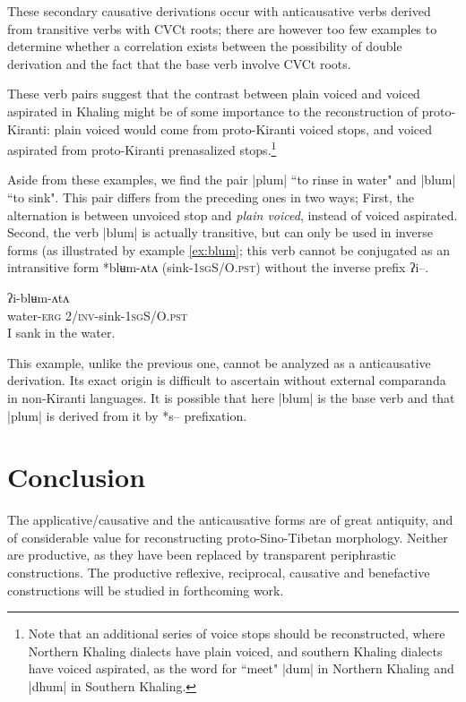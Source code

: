 \documentclass[oldfontcommands,oneside,a4paper,11pt]{article}
\newcommand{\ipa}[1]{{\phon #1}} %
\newcommand{\dhatu}[1]{|\ipa{#1}|}
\begin{document}
These secondary causative derivations occur with anticausative verbs derived from transitive verbs with CVCt roots; there are however too few examples to determine whether a correlation exists between the possibility of double derivation and the fact that the base verb involve CVCt roots.

These verb pairs suggest that the contrast between plain voiced and voiced aspirated in Khaling might be of some importance to the reconstruction of proto-Kiranti: plain voiced would come from proto-Kiranti voiced stops, and voiced aspirated from proto-Kiranti prenasalized stops.\footnote{Note that an additional series of voice stops should be reconstructed, where Northern Khaling dialects have plain voiced, and southern Khaling dialects have voiced aspirated, as the word for ``meet" \dhatu{dum} in Northern Khaling and \dhatu{dhum} in Southern Khaling.}


Aside from these examples, we find the pair \dhatu{plum} ``to rinse in water" and \dhatu{blum} ``to sink". This pair differs from the preceding ones in two ways; First, the alternation is between unvoiced stop and\textit{ plain voiced}, instead of voiced aspirated. Second, the verb \dhatu{blum} is actually transitive, but can only be used in inverse forms (as illustrated by example \ref{ex:blum}; this verb cannot be conjugated as an intransitive form *\ipa{blʉm-ʌtʌ} (sink-\textsc{1sgS/O.pst}) without the inverse prefix \ipa{ʔi--}.

\begin{exe}
\ex \label{ex:blum}
\gll \ipa{ku-ʔɛ} \ipa{ʔi-blʉm-ʌtʌ}\\
water-\textsc{erg} \textsc{2/inv}-sink-\textsc{1sgS/O.pst} \\
\glt I sank in the water.
\end{exe}

 
This example, unlike the previous one, cannot be analyzed as a anticausative derivation. Its exact origin is difficult to ascertain without external comparanda in non-Kiranti languages. It is possible that here \dhatu{blum} is the base verb and that \dhatu{plum} is derived from it by *s-- prefixation.
 


\section{Conclusion}
The applicative/causative and the anticausative forms are of great antiquity, and of considerable value for reconstructing  proto-Sino-Tibetan morphology. Neither are productive, as they have been replaced by transparent periphrastic constructions. The productive reflexive, reciprocal, causative and benefactive constructions will be studied in forthcoming work.






\end{document}
